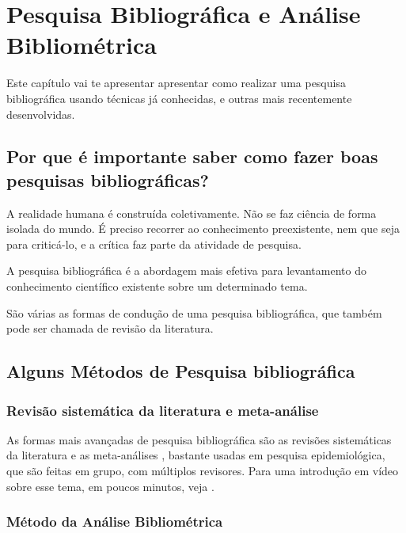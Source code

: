 \chapter{Pesquisa Bibliográfica e Análise Bibliométrica\label{chap:pesquisa:bibliografica:analise:bibliometrica}}

Este capítulo vai te apresentar apresentar como realizar uma pesquisa bibliográfica usando técnicas já conhecidas, e outras mais recentemente desenvolvidas.

\section{Por que é importante saber como fazer boas pesquisas bibliográficas?}

A realidade humana é construída coletivamente. Não se faz ciência de forma isolada do mundo. É preciso recorrer ao conhecimento preexistente, nem que seja para criticá-lo, e a crítica faz parte da atividade de pesquisa.

A pesquisa bibliográfica é a abordagem mais efetiva para levantamento do conhecimento científico existente sobre um determinado tema.

São várias as formas de condução de uma pesquisa bibliográfica, que também pode ser chamada de revisão da literatura.

\section{Alguns Métodos de Pesquisa bibliográfica}

\subsection{Revisão sistemática da literatura e meta-análise}

As formas mais avançadas de pesquisa bibliográfica  são as revisões sistemáticas da literatura e as meta-análises \citep{littell_systematic_2008,dresch_systematic_2015,higgins_cochrane_2011}, bastante usadas em pesquisa epidemiológica, que são feitas em grupo, com múltiplos revisores. Para uma introdução em vídeo sobre esse tema, em poucos minutos, veja \cite{testoni_revisao_2015}.

\subsection{Método da Análise Bibliométrica\label{metodo:analise:bibliografica}}

